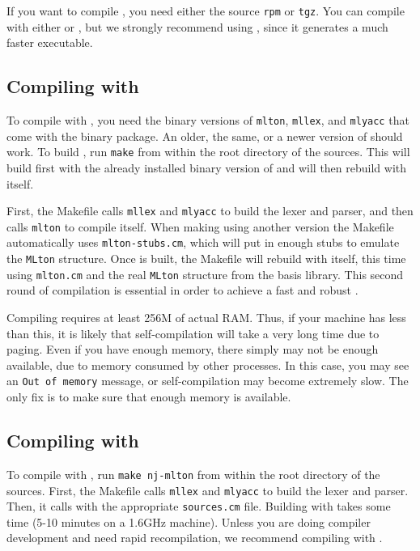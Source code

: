 %
If you want to compile {\mlton}, you need either the source {\tt rpm}
or {\tt tgz}.  You can compile with either {\mlton} or {\smlnj}, but
we strongly recommend using {\mlton}, since it generates a much faster
executable.
%
\subsection{Compiling with {\mlton}}

To compile with {\mlton}, you need the binary versions of {\tt mlton},
{\tt mllex}, and {\tt mlyacc} that come with the {\mlton} binary
package.  An older, the same, or a newer version of {\mlton} should
work.  To build {\mlton}, run {\tt make} from within the root
directory of the sources.  This will build {\mlton} first with the
already installed binary version of {\mlton} and will then rebuild
{\mlton} with itself.

First, the Makefile calls {\tt mllex} and {\tt mlyacc} to build the
lexer and parser, and then calls {\tt mlton} to compile itself.  When
making {\mlton} using another version the Makefile automatically uses
{\tt mlton-stubs.cm}, which will put in enough stubs to emulate the
{\tt MLton} structure.  Once {\mlton} is built, the Makefile will
rebuild {\mlton} with itself, this time using {\tt mlton.cm} and the
real {\tt MLton} structure from the basis library.  This second round
of compilation is essential in order to achieve a fast and robust
{\mlton}.

Compiling {\mlton} requires at least 256M of actual RAM.  Thus, if
your machine has less than this, it is likely that self-compilation
will take a very long time due to paging.  Even if you have enough
memory, there simply may not be enough available, due to memory
consumed by other processes.  In this case, you may see an {\tt Out of
memory} message, or self-compilation may become extremely slow.  The
only fix is to make sure that enough memory is available.
%
\subsection{Compiling with {\smlnj}}

To compile with {\smlnj}, run {\tt make nj-mlton} from within the root
directory of the sources.  First, the Makefile calls {\tt mllex} and
{\tt mlyacc} to build the lexer and parser.  Then, it calls {\smlnj}
with the appropriate {\tt sources.cm} file.  Building with {\smlnj}
takes some time (5-10 minutes on a 1.6GHz machine).  Unless you are
doing compiler development and need rapid recompilation, we recommend
compiling with {\mlton}.
